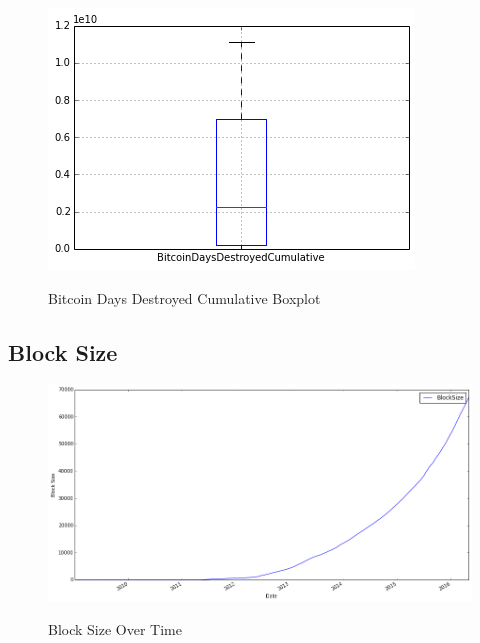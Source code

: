 \begin{figure}[bth]
  \myfloatalign
  {\includegraphics[width=1\linewidth]
    {gfx/bitcoin-days-destroyed-cumulative-boxplot}}
  \caption{Bitcoin Days Destroyed Cumulative Boxplot}
  \label{fig:bitcoin-days-destroyed-cumulative-boxplot}
\end{figure}

\clearpage

\subsection{Block Size}
\label{sec:block-size}

\begin{figure}[bth]
  \myfloatalign
  {\includegraphics[width=1\linewidth]
    {gfx/block-size-over-time}}
  \caption{Block Size Over Time}
  \label{fig:block-size-over-time}
\end{figure}

